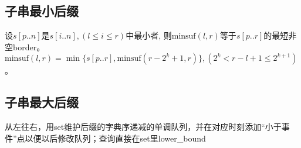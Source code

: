 	\subsection*{子串最小后缀}
		设$ s[p..n] $是$ s[i..n], (l \leq i \leq r) $中最小者, 则$ \text{minsuf}(l, r) $等于$ s[p..r] $的最短非空border。$ \text{minsuf}(l, r) = \min \lbrace s[p..r], \text{minsuf}(r - 2^k + 1, r) \rbrace, (2^k < r - l + 1 \leq 2^{k + 1} ) $。
	\subsection*{子串最大后缀}
		从左往右，用set维护后缀的字典序递减的单调队列，并在对应时刻添加“小于事件”点以便以后修改队列；查询直接在set里lower\_bound
